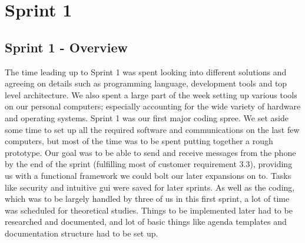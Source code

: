 \chapter{Sprint 1}

\section{Sprint 1 - Overview}
The time leading up to Sprint 1 was spent looking into different solutions and agreeing on details such as programming language, development tools and top level architecture. We also spent a large part of the week setting up various tools on our personal computers; especially accounting for the wide variety of hardware and operating systems.
\newline
\newline
Sprint 1 was our first major coding spree. We set aside some time to set up all the required software and communications on the last few computers, but most of the time was to be spent putting together a rough prototype. Our goal was to be able to send and receive messages from the phone by the end of the sprint (fulfilling most of customer requirement 3.3), providing us with a functional framework we could bolt our later expansions on to. Tasks like security and intuitive \gls{gui} were saved for later sprints.
\newline
\newline
As well as the coding, which was to be largely handled by three of us in this first sprint, a lot of time was scheduled for theoretical studies. Things to be implemented later had to be researched and documented, and lot of basic things like agenda templates and documentation structure had to be set up.